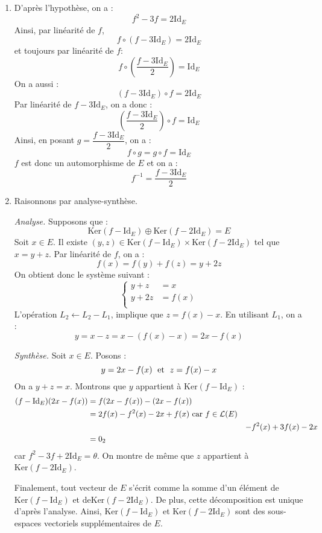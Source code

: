 \documentclass[a4paper,10pt]{report}
\begin{document}
\corr 

\begin{enumerate}
\item D'après l'hypothèse, on a :
$$ f^2-3f =  2 \textrm{Id}_E$$
Ainsi, par linéarité de $f$,
$$ f \circ (f-3 \textrm{Id}_E) = 2 \textrm{Id}_E$$
et toujours par linéarité de $f$:
$$ f \circ \left( \dfrac{f-3 \textrm{Id}_E}{2} \right) = \textrm{Id}_E$$
On a aussi :
$$ (f- 3 \textrm{Id}_E) \circ f = 2 \textrm{Id}_E$$
Par linéarité de $f- 3 \textrm{Id}_E$, on a donc :
$$ \left( \dfrac{f-3 \textrm{Id}_E}{2} \right) \circ f = \textrm{Id}_E$$
Ainsi, en posant $g = \dfrac{f-3 \textrm{Id}_E}{2}$, on a :
$$f \circ g = g \circ f = \textrm{Id}_E$$
$f$ est donc un automorphisme de $E$ et on a :
$$ f^{-1} = \dfrac{f-3 \textrm{Id}_E}{2}$$
\item Raisonnons par analyse-synthèse.

\medskip

\noindent \textit{Analyse.} Supposons que :
$$\textrm{Ker}(f - \textrm{Id}_E) \oplus \textrm{Ker}(f - 2\textrm{Id}_E) = E$$
Soit $x \in E$. Il existe $(y,z) \in \textrm{Ker}(f - \textrm{Id}_E) \times \textrm{Ker}(f - 2\textrm{Id}_E)$ tel que $x=y+z$. Par linéarité de $f$, on a :
$$f(x) = f(y) + f(z) = y+2z$$
On obtient donc le système suivant :
$$ \left\lbrace \begin{array}{rcl}
 y+z & = x \\
y+2z & = f(x)\\
\end{array}\right.$$
L'opération $L_2 \leftarrow L_2- L_1$, implique que $z = f(x)-x$. En utilisant $L_1$, on a :
$$ y= x-z = x -(f(x)-x)= 2x-f(x)$$

\medskip

\noindent \textit{Synthèse.} Soit $x \in E$. Posons :
$$ y= 2x-f(x) \; \hbox{ et } \; z= f(x)-x$$
On a $y+z=x$. Montrons que $y$ appartient à $\textrm{Ker}(f - \textrm{Id}_E)$ :
\begin{align*}
(f - \textrm{Id}_E)(2x-f(x)) & = f(2x-f(x))- (2x-f(x)) \\
& = 2f(x) -f^2(x)-2x+f(x) \hbox{ car } f \in \mathcal{L}(E) \\
&  &- f^2(x) +3f(x) -2x \\
& = 0_2
\end{align*}
car $f^2 - 3f + 2 \textrm{Id}_E = \theta$. On montre de même que $z$ appartient à $\textrm{Ker}(f - 2\textrm{Id}_E)$.

\medskip

\noindent Finalement, tout vecteur de $E$ s'écrit comme la somme d'un élément de $\textrm{Ker}(f - \textrm{Id}_E)$ et de$\textrm{Ker}(f - 2\textrm{Id}_E)$. De plus, cette décomposition est unique d'après l'analyse. Ainsi, $\textrm{Ker}(f - \textrm{Id}_E)$ et $\textrm{Ker}(f - 2\textrm{Id}_E)$ sont des sous-espaces vectoriels supplémentaires de $E$.
\end{enumerate}
\end{document}

